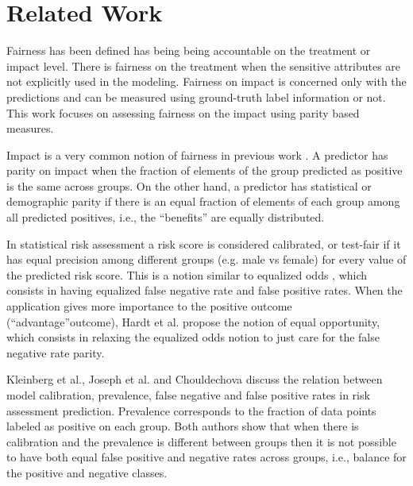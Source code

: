 \section{Related Work}

Fairness has been defined has being being accountable on the treatment \cite{pedreshi2008discrimination,dwork2012fairness,luong2011k,calders2013unbiased,hardt2016equality} or impact level\cite{kleinberg2016inherent,chouldechova2017fair,feldman2015certifying}. There is fairness on the treatment when the sensitive attributes are not explicitly used in the modeling. Fairness on impact is concerned only with the predictions and can be measured using ground-truth label information or not. This work focuses on assessing fairness on the impact using parity based measures.

Impact is a very common notion of fairness in previous work \cite{calders2010three,hardt2016equality,zafar2017fairnessw,feldman2015certifying,zemel2013learning,kamishima2011fairness,zafar2017fairness}. A predictor has parity on impact when the fraction of elements of the group predicted as positive is the same across groups. On the other hand, a predictor has statistical or demographic parity \cite{calders2009building,luong2011k,zemel2013learning,dwork2012fairness,zliobaite2015relation,zafar2015learning,corbett2017algorithmic} if there is an equal fraction of elements of each group among all predicted positives, i.e., the ``benefits'' are equally distributed.

In statistical risk assessment a risk score is considered calibrated, or test-fair \cite{kleinberg2016inherent,chouldechova2017fair} if it has equal precision among different groups (e.g. male vs female) for every value of the predicted risk score. This is a notion similar to equalized odds \cite{hardt2016equality}, which consists in having equalized false negative rate and false positive rates. When the application gives more importance to the positive outcome (``advantage''outcome), Hardt et al.\cite{hardt2016equality} propose the notion of equal opportunity, which consists in relaxing the equalized odds notion to just care for the false negative rate parity. 

Kleinberg et al.\cite{kleinberg2016inherent}, Joseph et al. \cite{joseph2016fairness} and Chouldechova \cite{chouldechova2017fair} discuss the relation between model calibration, prevalence, false negative and false positive rates in risk assessment prediction. Prevalence corresponds to the fraction of data points labeled as positive on each group. Both authors show that when there is calibration and the prevalence is different between groups then it is not possible to have both equal false positive and negative rates across groups, i.e., balance for the positive and negative classes. 

